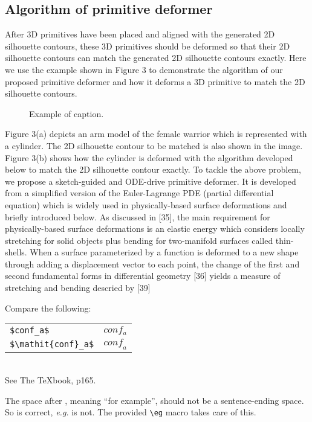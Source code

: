 \documentclass[10pt,twocolumn,letterpaper]{article}
\begin{document}
\subsection{Algorithm of primitive deformer}
After 3D primitives have been placed and aligned with the generated 2D silhouette contours, these 3D primitives should be deformed so that their 2D silhouette contours can match the generated 2D silhouette contours exactly. Here we use the example shown in Figure 3 to demonstrate the algorithm of our proposed primitive deformer and how it deforms a 3D primitive to match the 2D silhouette contours. 
\begin{figure}[t]
\begin{center}
\fbox{\rule{0pt}{2in} \rule{0.9\linewidth}{0pt}}
\end{center}
   \caption{Example of caption.  }
\label{fig:long}
\label{fig:onecol}
\end{figure}
Figure 3(a) depicts an arm model of the female warrior which is represented with a cylinder. The 2D silhouette contour to be matched is also shown in the image. Figure 3(b) shows how the cylinder is deformed with the algorithm developed below to match the 2D silhouette contour exactly. 
To tackle the above problem, we propose a sketch-guided and ODE-drive primitive deformer. It is developed from a simplified version of the Euler-Lagrange PDE (partial differential equation) which is widely used in physically-based surface deformations and briefly introduced below.
As discussed in [35], the main requirement for physically-based surface deformations is an elastic energy which considers locally stretching for solid objects plus bending for two-manifold surfaces called thin-shells. When a surface  parameterized by a function   is deformed to a new shape  through adding a displacement vector  to each point, the change of the first and second fundamental forms  in differential geometry [36] yields a measure of stretching and bending descried by [39]

\noindent
Compare the following:\\
\begin{tabular}{ll}
 \verb'$conf_a$' &  $conf_a$ \\
 \verb'$\mathit{conf}_a$' & $\mathit{conf}_a$
\end{tabular}\\
See The \TeX book, p165.

The space after \eg, meaning ``for example'', should not be a
sentence-ending space. So \eg is correct, {\em e.g.} is not.  The provided
\verb'\eg' macro takes care of this.
\end{document}
